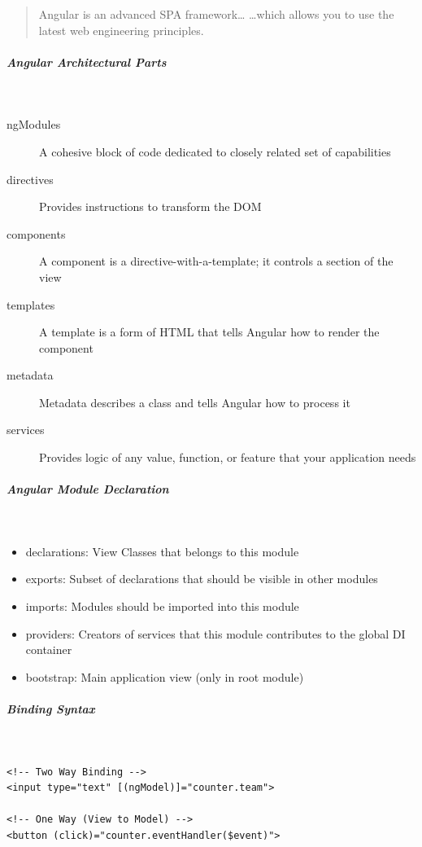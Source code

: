 \documentclass[11pt,twoside,landscape]{article}
\begin{document}
\begin{multicols}{3}
\begin{quote}
Angular is an advanced SPA framework…
…which allows you to use the latest web engineering principles.
\end{quote}
\subparagraph{Angular Architectural Parts} \
\label{sec:orge02eebc}
\begin{description}
\item[{ngModules}] A cohesive block of code dedicated to closely related set of capabilities
\item[{directives}] Provides instructions to transform the DOM
\item[{components}] A component is a directive-with-a-template; it controls a section of the view
\item[{templates}] A template is a form of HTML that tells Angular how to render the component
\item[{metadata}] Metadata describes a class and tells Angular how to process it
\item[{services}] Provides logic of any value, function, or feature that your application needs
\end{description}
\subparagraph{Angular Module Declaration} \
\label{sec:orge4ab144}
\begin{itemize}
\item declarations: View Classes that belongs to this module
\item exports: Subset of declarations that should be visible in other modules
\item imports: Modules should be imported into this module
\item providers: Creators of services that this module contributes to the global DI container
\item bootstrap: Main application view (only in root module)
\end{itemize}
\subparagraph{Binding Syntax} \
\label{sec:org5099b5b}
{
\begin{verbatim}
<!-- Two Way Binding -->
<input type="text" [(ngModel)]="counter.team">

<!-- One Way (View to Model) -->
<button (click)="counter.eventHandler($event)">


\end{verbatim}}
\end{multicols}
\end{document}
